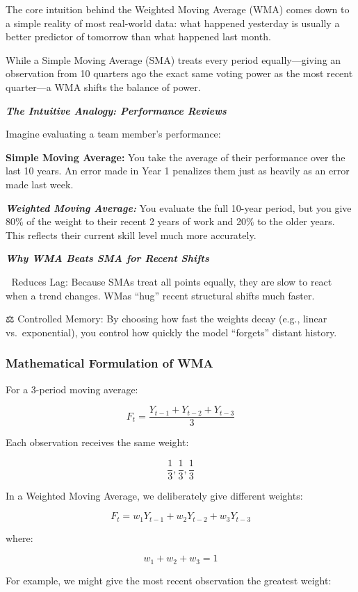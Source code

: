 \documentclass[
  a4paper,
]{article}
\begin{document}
The core intuition behind the Weighted Moving Average (WMA) comes down
to a simple reality of most real-world data: what happened yesterday is
usually a better predictor of tomorrow than what happened last month.

While a Simple Moving Average (SMA) treats every period equally---giving
an observation from 10 quarters ago the exact same voting power as the
most recent quarter---a WMA shifts the balance of power.

\textbf{\emph{The Intuitive Analogy: Performance Reviews}}

Imagine evaluating a team member's performance:

\textbf{Simple Moving Average:} You take the average of their
performance over the last 10 years. An error made in Year 1 penalizes
them just as heavily as an error made last week.

\textbf{\emph{Weighted Moving Average:}} You evaluate the full 10-year
period, but you give 80\% of the weight to their recent 2 years of work
and 20\% to the older years. This reflects their current skill level
much more accurately.

\textbf{\emph{Why WMA Beats SMA for Recent Shifts}}

🎯 Reduces Lag: Because SMAs treat all points equally, they are slow to
react when a trend changes. WMas ``hug'' recent structural shifts much
faster.

⚖️ Controlled Memory: By choosing how fast the weights decay (e.g.,
linear vs.~exponential), you control how quickly the model ``forgets''
distant history.

\subsubsection{Mathematical Formulation of
WMA}\label{mathematical-formulation-of-wma}

For a 3-period moving average:

\[ F_t=\frac{Y_{t-1}+Y_{t-2}+Y_{t-3}}{3} \]

Each observation receives the same weight:

\[ \frac13,\frac13,\frac13 \]

In a Weighted Moving Average, we deliberately give different weights:

\[ F_t=w_1Y_{t-1}+w_2Y_{t-2}+w_3Y_{t-3} \]

where:

\[ w_1+w_2+w_3=1 \]

For example, we might give the most recent observation the greatest
weight:
\end{document}
